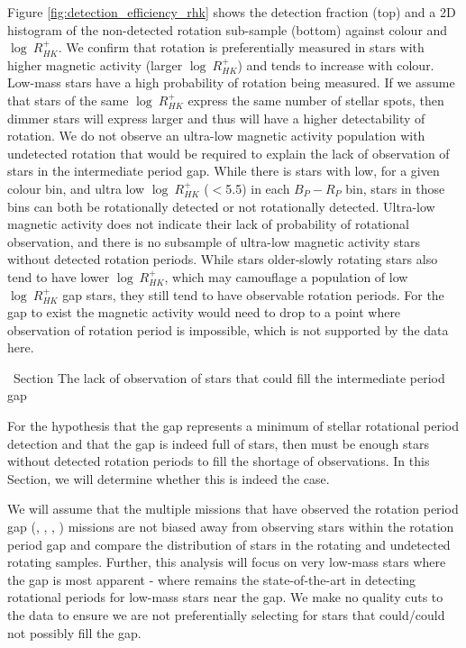 Figure \ref{fig:detection_efficiency_rhk} shows the detection fraction (top) and a 2D histogram of the non-detected rotation sub-sample (bottom) against colour and $\log \ R^{+}_{HK}$. 
We confirm that rotation is preferentially measured in stars with higher magnetic activity (larger $\log \ R^{+}_{HK}$) and tends to increase with colour. 
Low-mass stars have a high probability of rotation being measured.
If we assume that stars of the same $\log \ R^{+}_{HK}$ express the same number of stellar spots, then dimmer stars will express larger \rper{} and thus will have a higher detectability of rotation.
We do not observe an ultra-low magnetic activity population with undetected rotation that would be required to explain the lack of observation of stars in the intermediate period gap.
While there is stars with low, for a given colour bin, and ultra low $\log \ R^{+}_{HK}$ ($<$5.5) in each $B_P-R_P$ bin, stars in those bins can both be rotationally detected or not rotationally detected. 
Ultra-low magnetic activity does not indicate their lack of probability of rotational observation, and there is no subsample of ultra-low magnetic activity stars without detected rotation periods.
While stars older-slowly rotating stars also tend to have lower $\log \ R^{+}_{HK}$, which may camouflage a population of low $\log \ R^{+}_{HK}$ gap stars, they still tend to have observable rotation periods.
For the gap to exist the magnetic activity would need to drop to a point where observation of rotation period is impossible, which is not supported by the data here.

\ Section {The lack of observation of stars that could fill the intermediate period gap}
\label{sec:no_gap_stars}

For the hypothesis that the gap represents a minimum of stellar rotational period detection and that the gap is indeed full of stars, then must be enough stars without detected rotation periods to fill the shortage of observations.
In this Section, we will determine whether this is indeed the case.

We will assume that the multiple missions that have observed the rotation period gap (\kepler, \ktoo, \ZTF, \tess) missions are not biased away from observing stars within the rotation period gap and compare the distribution of stars in the \citet{mcquillan_rotation_2014} \kepler{} rotating and undetected rotating samples.
Further, this analysis will focus on very low-mass stars where the gap is most apparent - where \citet{mcquillan_rotation_2014} remains the state-of-the-art in detecting rotational periods for low-mass stars near the gap.
We make no quality cuts to the data to ensure we are not preferentially selecting for stars that could/could not possibly fill the gap.

